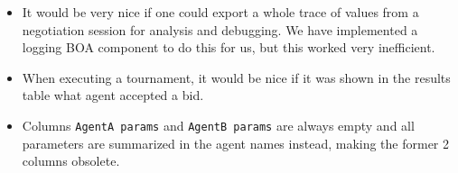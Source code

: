 \begin{itemize}
\item It would be very nice if one could export a whole trace of values from a negotiation
session for analysis and debugging. We have implemented a logging BOA component to do this for us, but this worked very inefficient.
\item When executing a tournament, it would be nice if it was shown in the results table what agent accepted a bid.
\item Columns \texttt{AgentA params} and \texttt{AgentB params} are always empty and all parameters are summarized in the agent names instead, making the former 2 columns obsolete.
\end{itemize}

